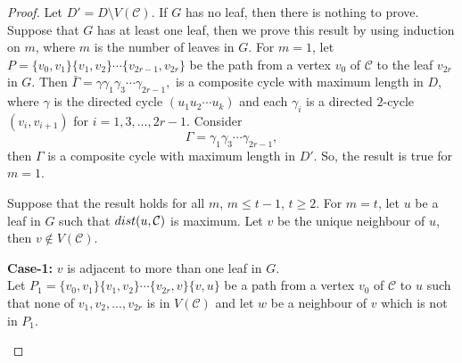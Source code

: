 \documentclass[10pt,a4paper]{amsart}
\numberwithin{equation}{section}
\def\dist{{\rm dist}}
\begin{document}
\begin{proof} Let $D'=D\setminus V(\mathcal{C})$. If $G$ has no leaf, then there is nothing to prove. Suppose that $G$ has at least one leaf, then we prove this result by using induction on $m$, where $m$ is the number of leaves in $G$. For $m=1$, let $P=\{v_0,v_1\}\{v_1,v_2\}\cdots \{v_{2r-1},v_{2r}\}$ be the path from a vertex $v_0$ of $\mathcal{C}$ to the leaf $v_{2r}$ in $G$. Then $\bar{\Gamma}=\gamma\gamma_1\gamma_3\cdots\gamma_{2r-1},$ is a composite cycle with maximum length in $D$, 
	where $\gamma$ is the directed cycle $(u_1u_2\cdots u_k)$ and each $\gamma_i$ is a directed $2$-cycle $(v_i,v_{i+1})$ for $i=1,3,...,2r-1$. Consider
	$$\Gamma=\gamma_1\gamma_3\cdots\gamma_{2r-1},$$ 
	then $\Gamma$ is a composite cycle with maximum length in $D'$. So, the result is true for $m=1$.
	
	Suppose that the result holds
	for all $m$, $m \leq t-1$, $t \geq 2$.
	For $m = t$, let $u$ be a leaf in $G$ such that $\dist(u,\mathcal{C})$ is maximum. Let $v$ be the unique neighbour of $u$, then $v\notin V(\mathcal{C})$.
	
	\textbf{Case-1:} $v$ is adjacent to more than one leaf in $G$.\\
	Let $P_1=\{v_0,v_1\}\{v_1,v_2\}\cdots \{v_{2r},v\}\{v,u\}$ be a path from a vertex $v_0$ of $\mathcal{C}$ to $u$ such that none of $v_1,v_2,...,v_{2r}$ is in $V(\mathcal{C})$ and let $w$ be a neighbour of $v$ which is not in $P_1$. 
	\begin{figure}[H]
		\tikzset{node distance=1cm}
		\centering
\end{figure}
\end{proof}
\end{document}
